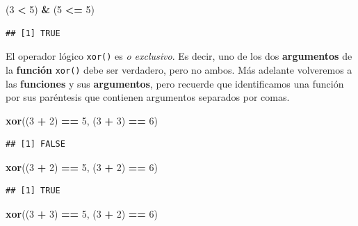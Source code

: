 \documentclass[]{book}
\newenvironment{Shaded}{\begin{snugshade}}{\end{snugshade}}
\newcommand{\KeywordTok}[1]{\textcolor[rgb]{0.13,0.29,0.53}{\textbf{#1}}}
\newcommand{\DecValTok}[1]{\textcolor[rgb]{0.00,0.00,0.81}{#1}}
\newcommand{\StringTok}[1]{\textcolor[rgb]{0.31,0.60,0.02}{#1}}
\newcommand{\OperatorTok}[1]{\textcolor[rgb]{0.81,0.36,0.00}{\textbf{#1}}}
\newcommand{\NormalTok}[1]{#1}
\begin{document}
\begin{Shaded}
\begin{Highlighting}[]
\NormalTok{(}\DecValTok{3} \OperatorTok{<}\StringTok{ }\DecValTok{5}\NormalTok{) }\OperatorTok{&}\StringTok{ }\NormalTok{(}\DecValTok{5} \OperatorTok{<=}\StringTok{ }\DecValTok{5}\NormalTok{)}
\end{Highlighting}
\end{Shaded}

\begin{verbatim}
## [1] TRUE
\end{verbatim}

El operador lógico \texttt{xor()} es \emph{o exclusivo}. Es decir, uno
de los dos \textbf{argumentos} de la \textbf{función} \texttt{xor()}
debe ser verdadero, pero no ambos. Más adelante volveremos a las
\textbf{funciones} y sus \textbf{argumentos}, pero recuerde que
identificamos una función por sus paréntesis que contienen argumentos
separados por comas.

\begin{Shaded}
\begin{Highlighting}[]
\KeywordTok{xor}\NormalTok{((}\DecValTok{3} \OperatorTok{+}\StringTok{ }\DecValTok{2}\NormalTok{) }\OperatorTok{==}\StringTok{ }\DecValTok{5}\NormalTok{, (}\DecValTok{3} \OperatorTok{+}\StringTok{ }\DecValTok{3}\NormalTok{) }\OperatorTok{==}\StringTok{ }\DecValTok{6}\NormalTok{)}
\end{Highlighting}
\end{Shaded}

\begin{verbatim}
## [1] FALSE
\end{verbatim}

\begin{Shaded}
\begin{Highlighting}[]
\KeywordTok{xor}\NormalTok{((}\DecValTok{3} \OperatorTok{+}\StringTok{ }\DecValTok{2}\NormalTok{) }\OperatorTok{==}\StringTok{ }\DecValTok{5}\NormalTok{, (}\DecValTok{3} \OperatorTok{+}\StringTok{ }\DecValTok{2}\NormalTok{) }\OperatorTok{==}\StringTok{ }\DecValTok{6}\NormalTok{)}
\end{Highlighting}
\end{Shaded}

\begin{verbatim}
## [1] TRUE
\end{verbatim}

\begin{Shaded}
\begin{Highlighting}[]
\KeywordTok{xor}\NormalTok{((}\DecValTok{3} \OperatorTok{+}\StringTok{ }\DecValTok{3}\NormalTok{) }\OperatorTok{==}\StringTok{ }\DecValTok{5}\NormalTok{, (}\DecValTok{3} \OperatorTok{+}\StringTok{ }\DecValTok{2}\NormalTok{) }\OperatorTok{==}\StringTok{ }\DecValTok{6}\NormalTok{)}
\end{Highlighting}
\end{Shaded}
\end{document}
